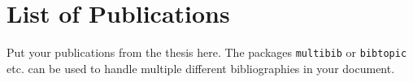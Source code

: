 \chapter*{List of Publications}

\bigskip

\noindent Put your publications from the thesis here. The packages \texttt{multibib} or \texttt{bibtopic} etc. can be used to handle multiple different bibliographies in your document.
